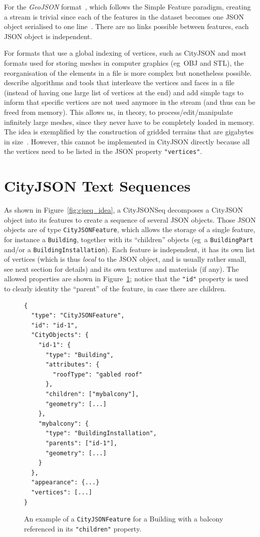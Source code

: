 \documentclass{isprs} %
\newcommand{\eg}{eg}
\begin{document}
%

For the \emph{GeoJSON} format~\citep{IETF-GeoJSON}, which follows the Simple Feature paradigm, creating a stream is trivial since each of the features in the dataset becomes one JSON object serialised to one line~\citep{IETF-GeoJSONSeq}.
There are no links possible between features, each JSON object is independent.

%

For formats that use a global indexing of vertices, such as CityJSON and most formats used for storing meshes in computer graphics (\eg\ OBJ and STL), the reorganisation of the elements in a file is more complex but nonetheless possible.
\citet{Isenburg03} describe algorithms and tools that interleave the vertices and faces in a file (instead of having one large list of vertices at the end) and add simple tags to inform that specific vertices are not used anymore in the stream (and thus can be freed from memory).
This allows us, in theory, to process/edit/manipulate infinitely large meshes, since they never have to be completely loaded in memory.
The idea is exemplified by the construction of gridded terrains that are gigabytes in size~\citep{Isenburg06-1}.
However, this cannot be implemented in CityJSON directly because all the vertices need to be listed in the JSON property \texttt{"vertices"}.


%
\section{CityJSON Text Sequences}%
\label{sec:cityjsonseq}


As shown in Figure~\ref{fig:cjseq_idea}, a CityJSONSeq decomposes a CityJSON object into its features to create a sequence of several JSON objects.
Those JSON objects are of type \texttt{CityJSONFeature}, which allows the storage of a single feature, for instance a \texttt{Building}, together with its ``children'' objects (\eg\ a \texttt{BuildingPart} and/or a \texttt{BuildingInstallation}). 
Each feature is independent, it has its own list of vertices (which is thus \emph{local} to the JSON object, and is usually rather small, see next section for details) and its own textures and materials (if any).
The allowed properties are shown in Figure~\ref{fig:cjfeature}; notice that the \texttt{"id"} property is used to clearly identity the ``parent'' of the feature, in case there are children.
\begin{figure}
\begin{lstlisting}
{
  "type": "CityJSONFeature",
  "id": "id-1", 
  "CityObjects": {
    "id-1": {
      "type": "Building", 
      "attributes": { 
        "roofType": "gabled roof"
      },
      "children": ["mybalcony"],
      "geometry": [...]
    },
    "mybalcony": {
      "type": "BuildingInstallation", 
      "parents": ["id-1"],
      "geometry": [...]
    }
  },
  "appearance": {...}
  "vertices": [...]
}
\end{lstlisting}
\caption{An example of a \texttt{CityJSONFeature} for a Building with a balcony referenced in its \texttt{"children"} property.}%
\label{fig:cjfeature}
\end{figure}
\end{document}
